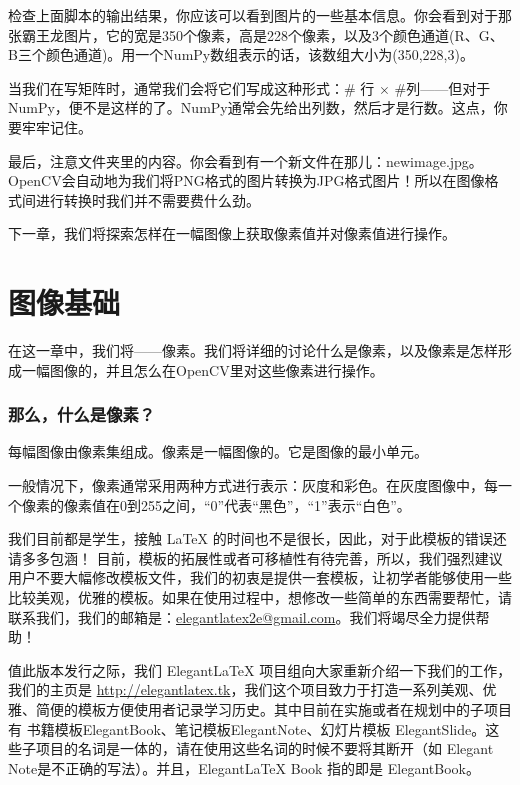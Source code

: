 \documentclass[color=green,mathpazo,titlestyle=hang]{elegantbook}
\begin{document}
检查上面脚本的输出结果，你应该可以看到图片的一些基本信息。你会看到对于那张霸王龙图片，它的宽是350个像素，高是228个像素，以及3个颜色通道(R、G、B三个颜色通道)。用一个NumPy数组表示的话，该数组大小为(350,228,3)。

当我们在写矩阵时，通常我们会将它们写成这种形式：\# 行 $\times$ \#列——但对于NumPy，便不是这样的了。NumPy通常会先给出列数，然后才是行数。这点，你要牢牢记住。

最后，注意文件夹里的内容。你会看到有一个新文件在那儿：newimage.jpg。OpenCV会自动地为我们将PNG格式的图片转换为JPG格式图片！所以在图像格式间进行转换时我们并不需要费什么劲。

下一章，我们将探索怎样在一幅图像上获取像素值并对像素值进行操作。

\chapter{图像基础}

在这一章中，我们将{\color{red}{审查图像的积木}}——像素。我们将详细的讨论什么是像素，以及像素是怎样形成一幅图像的，并且怎么在OpenCV里对这些像素进行操作。

\subsection{那么，什么是像素？}

每幅图像由像素集组成。像素是一幅图像的{\color{red}{原材料，积木}}。它是图像的最小单元。

一般情况下，像素通常采用两种方式进行表示：灰度和彩色。在灰度图像中，每一个像素的像素值在0到255之间，“0”代表“黑色”，“1”表示“白色”。

 我们目前都是学生，接触 \LaTeX{} 的时间也不是很长，因此，对于此模板的错误还请多多包涵！ 目前，模板的拓展性或者可移植性有待完善，所以，我们强烈建议用户不要大幅修改模板文件，我们的初衷是提供一套模板，让初学者能够使用一些比较美观，优雅的模板。如果在使用过程中，想修改一些简单的东西需要帮忙，请联系我们，我们的邮箱是：\href{elegantlatex2e@gmail.com}{elegantlatex2e@gmail.com}。我们将竭尽全力提供帮助！

值此版本发行之际，我们 Elegant\LaTeX{} 项目组向大家重新介绍一下我们的工作，我们的主页是 \url{http://elegantlatex.tk}，我们这个项目致力于打造一系列美观、优雅、简便的模板方便使用者记录学习历史。其中目前在实施或者在规划中的子项目有 书籍模板ElegantBook、笔记模板ElegantNote、幻灯片模板 ElegantSlide。这些子项目的名词是一体的，请在使用这些名词的时候不要将其断开（如 Elegant Note是不正确的写法）。并且，Elegant\LaTeX{}  Book 指的即是 ElegantBook。
\end{document}
